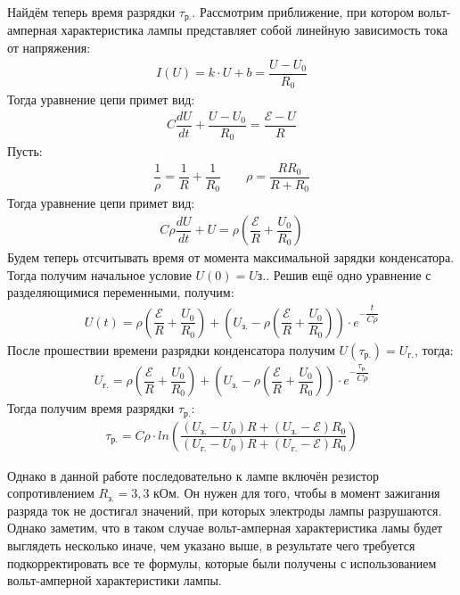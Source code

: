 \documentclass[a4paper, usenames, dvipsnames]{article}
\begin{document}
Найдём теперь время разрядки $\tau_\text{р.}$.
Рассмотрим приближение, при котором вольт-амперная характеристика лампы
представляет собой линейную зависимость тока от напряжения:
\begin{gather*}
    I(U) = k \cdot U + b = \dfrac{U - U_0}{R_0}
\end{gather*}
Тогда уравнение цепи примет вид:
\begin{gather*}
    C\dfrac{dU}{dt} + \dfrac{U - U_0}{R_0} = \dfrac{\mathcal{E} - U}{R}
\end{gather*}
Пусть:
\begin{gather*}
    \dfrac{1}{\rho} = \dfrac{1}{R} + \dfrac{1}{R_0} \hspace{2em} \rho = \dfrac{RR_0}{R + R_0}
\end{gather*}
Тогда уравнение цепи примет вид:
\begin{gather*}
    C \rho \dfrac{dU}{dt} + U = \rho \left(\dfrac{\mathcal{E}}{R} + \dfrac{U_0}{R_0}\right)
\end{gather*}
Будем теперь отсчитывать время от момента максимальной зарядки конденсатора.
Тогда получим начальное условие $U(0) = U\text{з.}$.
Решив ещё одно уравнение с разделяющимися переменными, получим:
\begin{gather*}
    U(t) = \rho \left(\dfrac{\mathcal{E}}{R} + \dfrac{U_0}{R_0}\right)
    + \left(U_\text{з.} - \rho \left(\dfrac{\mathcal{E}}{R} + \dfrac{U_0}{R_0}\right)\right)
    \cdot e^{-\dfrac{t}{C \rho}}
\end{gather*}
После прошествии времени разрядки конденсатора получим $U(\tau_\text{р.}) = U_\text{г.}$,
тогда:
\begin{gather*}
    U_\text{г.} = \rho \left(\dfrac{\mathcal{E}}{R} + \dfrac{U_0}{R_0}\right)
    + \left(U_\text{з.} - \rho \left(\dfrac{\mathcal{E}}{R} + \dfrac{U_0}{R_0}\right)\right)
    \cdot e^{-\dfrac{\tau_\text{р.}}{C \rho}}
\end{gather*}
Тогда получим время разрядки $\tau_\text{р.}$:
\begin{gather*}
    \tau_\text{р.} = C \rho \cdot ln\left(\dfrac{(U_\text{з.} - U_0)R + (U_\text{з.}
            - \mathcal{E})R_0}{(U_\text{г.} - U_0)R + (U_\text{г.} - \mathcal{E})R_0}\right)
\end{gather*}

Однако в данной работе последовательно к лампе включён резистор сопротивлением
$R_\text{з.} = 3,3$ кОм.
Он нужен для того, чтобы в момент зажигания разряда ток не достигал значений,
при которых электроды лампы разрушаются. Однако заметим,
что в таком случае вольт-амперная характеристика ламы будет выглядеть несколько иначе,
чем указано выше, в результате чего требуется подкорректировать все те формулы,
которые были получены с использованием вольт-амперной характеристики лампы.
\end{document}
